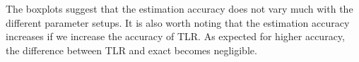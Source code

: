 \documentclass[conference]{IEEEtran}
\begin{document}
The boxplots suggest that the estimation accuracy does not vary much with the different parameter setups. It is also worth noting that the estimation accuracy increases if we increase the accuracy of TLR. As expected for higher accuracy, the difference between TLR and exact becomes negligible.



%
\end{document}
